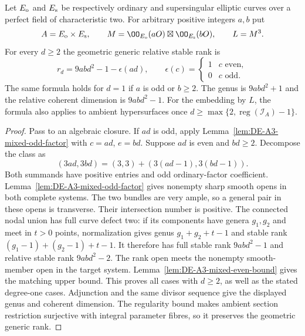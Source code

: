 \begin{theorem}
\label{thm:DE-A3-mixed-all-product-ranks}
Let $E_{\rm o}$ and $E_{\rm s}$ be respectively ordinary and
supersingular elliptic curves over a perfect field of characteristic
two.  For arbitrary positive integers $a,b$ put
\[
 A=E_{\rm o}\times E_{\rm s},\qquad
 M=\OO_{E_{\rm o}}(aO)\boxtimes\OO_{E_{\rm s}}(bO),\qquad L=M^3.
\]
For every $d\ge2$ the geometric generic relative stable rank is
\[
                    r_d=9abd^2-1-\epsilon(ad),
 \qquad
 \epsilon(c)=
 \begin{cases}1&c\text{ even},\\0&c\text{ odd}.\end{cases}
\]
The same formula holds for $d=1$ if $a$ is odd or $b\ge2$.
The genus is $9abd^2+1$ and the relative coherent dimension is
$9abd^2-1$.  For the embedding by $L$, the formula also applies
to ambient hypersurfaces once
$d\ge\max\{2,\operatorname{reg}(\mathcal I_A)-1\}$.
\end{theorem}
\begin{proof}
Pass to an algebraic closure.  If $ad$ is odd, apply
Lemma~\ref{lem:DE-A3-mixed-odd-factor} with $c=ad$, $e=bd$.
Suppose $ad$ is even and $bd\ge2$.  Decompose the class as
\[
              (3ad,3bd)=(3,3)+(3(ad-1),3(bd-1)).
\]
Both summands have positive entries and odd ordinary-factor
coefficient.  Lemma~\ref{lem:DE-A3-mixed-odd-factor} gives
nonempty sharp smooth opens in both complete systems.
The two bundles are very ample, so a general pair in these
opens is transverse.  Their intersection number is positive.
The connected nodal union has full curve defect two:
if its components have genera $g_1,g_2$ and meet in $t>0$
points, normalization gives genus $g_1+g_2+t-1$ and stable rank
$(g_1-1)+(g_2-1)+t-1$.
It therefore has full stable rank $9abd^2-1$ and relative
stable rank $9abd^2-2$.  The rank open meets the nonempty
smooth-member open in the target system.
Lemma~\ref{lem:DE-A3-mixed-even-bound} gives the matching upper bound.
This proves all cases with $d\ge2$, as well as the stated
degree-one cases.
Adjunction and the same divisor sequence give the displayed
genus and coherent dimension.  The regularity bound makes
ambient section restriction surjective with integral parameter
fibres, so it preserves the geometric generic rank.
\end{proof}

